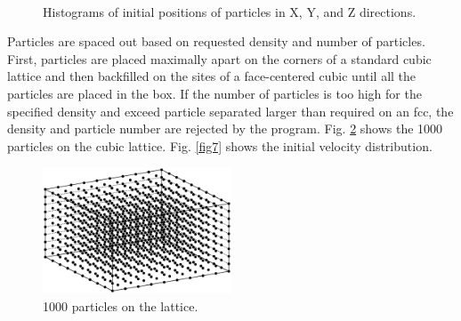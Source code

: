 \documentclass[singlepage,notitlepage,nofootinbib,11pt]{revtex4-1}
\begin{document}
\begin{figure}[h]
  \captionsetup[subfigure]{labelformat=empty}
  \centering
  \\
\hfill
  \caption{\label{fig5} Histograms of initial positions of particles in X, Y, and Z directions.}
\end{figure}
Particles are spaced out based on requested density and number of particles. First, particles are placed maximally apart on the corners of a standard cubic lattice and then backfilled on the sites of a face-centered cubic until all the particles are placed in the box. If the number of particles is too high for the specified density and exceed particle separated larger than required on an fcc, the density and particle number are rejected by the program. Fig. \ref{fig6} shows the 1000 particles on the cubic lattice. Fig. \ref{fig7} shows the initial velocity distribution.
\begin{figure}[h]
\centering
\includegraphics[width=0.5\textwidth]{figures/lattice_0.eps}
\caption{\label{fig6} 1000 particles on the lattice.}
\end{figure}
\end{document}
